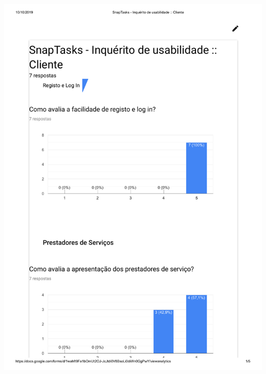 \includegraphics[page=3,origin=c, width=\textwidth ]{appendices/files/InquiryCustomerAnswers.pdf}

\pagebreak

